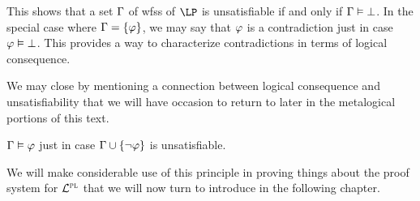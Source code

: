 This shows that a set $\Gamma$ of wfss of $\LP$ is unsatisfiable if and only if $\Gamma \vDash \bot$.
In the special case where $\Gamma = \lbrace\varphi\rbrace$, we may say that $\varphi$ is a contradiction just in case $\varphi \vDash \bot$. 
This provides a way to characterize contradictions in terms of logical consequence.

We may close by mentioning a connection between logical consequence and unsatisfiability that we will have occasion to return to later in the metalogical portions of this text.

\begin{Lthm} \label{lemma:unsat_consequence}
  $\Gamma \vDash \varphi$ just in case $\Gamma \cup \lbrace\neg \varphi\rbrace$ is unsatisfiable. 
\end{Lthm}

We will make considerable use of this principle in proving things about the proof system for $\mathcal{L}^{\textsc{pl}}$ that we will now turn to introduce in the following chapter.






